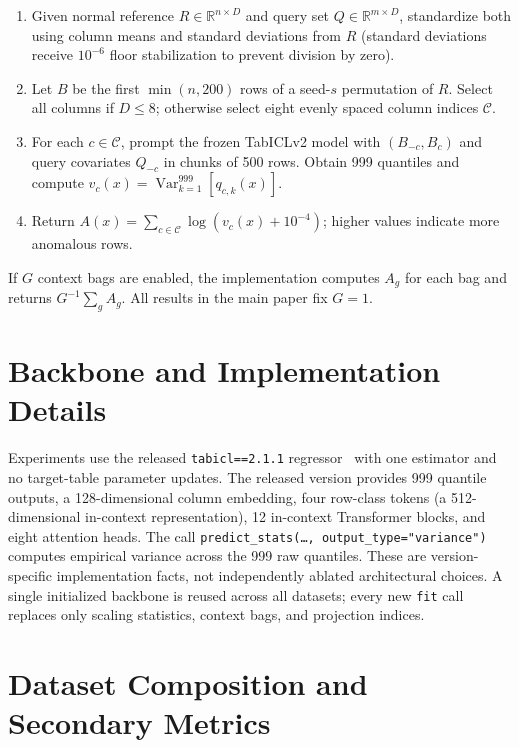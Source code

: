 \documentclass{article}
\begin{document}
\begin{enumerate}
  \item Given normal reference $R \in \mathbb{R}^{n \times D}$ and query set $Q \in \mathbb{R}^{m \times D}$, standardize both using column means and standard deviations from $R$ (standard deviations receive $10^{-6}$ floor stabilization to prevent division by zero).
  \item Let $B$ be the first $\min(n, 200)$ rows of a seed-$s$ permutation of $R$. Select all columns if $D \leq 8$; otherwise select eight evenly spaced column indices $\mathcal{C}$.
  \item For each $c \in \mathcal{C}$, prompt the frozen TabICLv2 model with $(B_{-c}, B_c)$ and query covariates $Q_{-c}$ in chunks of 500 rows. Obtain 999 quantiles and compute $v_c(x) = \operatorname{Var}_{k=1}^{999}[q_{c,k}(x)]$.
  \item Return $A(x) = \sum_{c \in \mathcal{C}} \log(v_c(x) + 10^{-4})$; higher values indicate more anomalous rows.
\end{enumerate}

If $G$ context bags are enabled, the implementation computes $A_g$ for each bag and returns $G^{-1} \sum_g A_g$. All results in the main paper fix $G = 1$.

\section{Backbone and Implementation Details}
\label{app:backbone}

Experiments use the released \texttt{tabicl==2.1.1} regressor~\citep{qu2026tabiclv2} with one estimator and no target-table parameter updates. The released version provides 999 quantile outputs, a 128-dimensional column embedding, four row-class tokens (a 512-dimensional in-context representation), 12 in-context Transformer blocks, and eight attention heads. The call \texttt{predict\_stats(\ldots, output\_type="variance")} computes empirical variance across the 999 raw quantiles. These are version-specific implementation facts, not independently ablated architectural choices. A single initialized backbone is reused across all datasets; every new \texttt{fit} call replaces only scaling statistics, context bags, and projection indices.

\section{Dataset Composition and Secondary Metrics}
\label{app:data}
\end{document}
